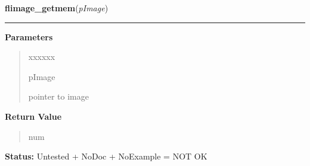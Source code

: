     \label{xformslib:library:flimage_getmem}

    \vspace{0.5ex}

\hspace{.8\funcindent}\begin{boxedminipage}{\funcwidth}

    \raggedright \textbf{flimage\_getmem}(\textit{pImage})

    \vspace{-1.5ex}

    \rule{\textwidth}{0.5\fboxrule}
\setlength{\parskip}{2ex}
\setlength{\parskip}{1ex}
      \textbf{Parameters}
      \vspace{-1ex}

      \begin{quote}
        \begin{Ventry}{xxxxxx}

          \item[pImage]

          pointer to image

        \end{Ventry}

      \end{quote}

      \textbf{Return Value}
    \vspace{-1ex}

      \begin{quote}
      num

      \end{quote}

\textbf{Status:} Untested + NoDoc + NoExample = NOT OK



    \end{boxedminipage}

    \label{xformslib:library:flimage_is_supported}

    \vspace{0.5ex}


